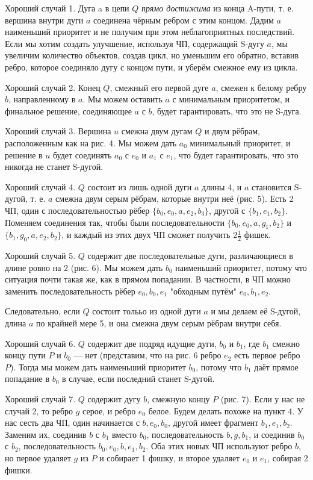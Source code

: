 \begin{proofstar}
\begin{proofstardetailed}
Хороший случай 1.
Дуга a в цепи $Q$ \textit{прямо достижима} из конца A-пути, т. е. вершина внутри дуги $a$ соединена чёрным ребром с этим концом. Дадим $a$ наименьший приоритет и не получим при этом неблагоприятных последствий. Если мы хотим создать улучшение, используя ЧП, содержащий S-дугу $a$, мы увеличим количество объектов, создав цикл, но уменьшим его обратно, вставив ребро, которое соединяло дугу с концом пути, и уберём смежное ему из цикла.

Хороший случай 2.
Конец $Q$, смежный его первой дуге $a$, смежен к белому ребру $b$, направленному в $a$. Мы можем оставить $a$ с минимальным приоритетом, и финальное решение, соединяющее $a$ с $b$, будет гарантировать, что это не S-дуга.

Хороший случай 3. 
Вершина $u$ смежна двум дугам $Q$ и двум рёбрам, расположенным как на рис. 4. Мы можем дать $a_0$ минимальный приоритет, и решение в $u$ будет соединять $a_0$ с $e_0$ и $a_1$ с $e_1$, что будет гарантировать, что это никогда не станет S-дугой.

Хороший случай 4.
$Q$ состоит из лишь одной дуги $a$ длины 4, и $a$ становится S-дугой, т. е. $a$ смежна двум серым рёбрам, которые внутри неё (рис. 5). Есть 2 ЧП, один с последовательностью рёбер $\{b_0, e_0, a, e_2, b_3\}$, другой с $\{b_1, e_1, b_2\}$. Поменяем соединения так, чтобы были последовательности $\{b_0, e_0, a, g_1, b_2\}$ и $\{b_1, g_0, a, e_2, b_2\}$, и каждый из этих двух ЧП сможет получить $2\frac{1}{2}$ фишек.

Хороший случай 5. $Q$ содержит две последовательные дуги, различающиеся в длине ровно на 2 (рис. 6). Мы можем дать $b_0$ наименьший приоритет, потому что ситуация почти такая же, как в прямом попадании. В частности, в ЧП можно заменить последовательность рёбер $e_0, b_0, e_1$ "обходным путём" $e_0, b_1, e_2$. 

Следовательно, если $Q$ состоит толььо из одной дуги $a$ и мы делаем её S-дугой, длина $a$ по крайней мере 5, и она смежна двум серым рёбрам внутри себя.

Хороший случай 6.
$Q$ содержит две подряд идущие дуги, $b_0$ и $b_1$, где $b_1$ смежно концу пути $P$ и $b_0$ --- нет (представим, что на рис. 6 ребро $e_2$ есть первое ребро $P$). Тогда мы можем дать наименьший приоритет $b_0$, потому что $b_1$ даёт прямое попадание в $b_0$ в случае, если последний станет S-дугой.

Хороший случай 7.
$Q$ содержит дугу $b$, смежную концу $P$ (рис. 7). Если у нас не случай 2, то ребро $g$ серое, и ребро $e_0$ белое. Будем делать похоже на пункт 4. У нас сесть два ЧП, один начинается с $b, e_0, b_0$, другой имеет фрагмент $b_1, e_1, b_2$. Заменим их, соединив $b$ с $b_1$ вместо $b_0$, последовательность $b, g, b_1$, и соединив $b_0$ с $b_2$, последовательность $b_0, e_0, b, e_1, b_2$. Оба этих новых ЧП используют ребро $b$, но первое удаляет $g$ из $P$ и собирает 1 фишку, и второе удаляет $e_0$ и $e_1$, собирая 2 фишки. 
\end{proofstardetailed}


\end{proofstar}

